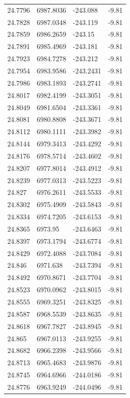\begin{table}[H]
\begin{tabular}{llll}
24.7796 & 6987.8036 & -243.088 & -9.81 \\
24.7828 & 6987.0348 & -243.119 & -9.81 \\
24.7859 & 6986.2659 & -243.15 & -9.81 \\
24.7891 & 6985.4969 & -243.181 & -9.81 \\
24.7923 & 6984.7278 & -243.212 & -9.81 \\
24.7954 & 6983.9586 & -243.2431 & -9.81 \\
24.7986 & 6983.1893 & -243.2741 & -9.81 \\
24.8017 & 6982.4199 & -243.3051 & -9.81 \\
24.8049 & 6981.6504 & -243.3361 & -9.81 \\
24.8081 & 6980.8808 & -243.3671 & -9.81 \\
24.8112 & 6980.1111 & -243.3982 & -9.81 \\
24.8144 & 6979.3413 & -243.4292 & -9.81 \\
24.8176 & 6978.5714 & -243.4602 & -9.81 \\
24.8207 & 6977.8014 & -243.4912 & -9.81 \\
24.8239 & 6977.0313 & -243.5223 & -9.81 \\
24.827 & 6976.2611 & -243.5533 & -9.81 \\
24.8302 & 6975.4909 & -243.5843 & -9.81 \\
24.8334 & 6974.7205 & -243.6153 & -9.81 \\
24.8365 & 6973.95 & -243.6463 & -9.81 \\
24.8397 & 6973.1794 & -243.6774 & -9.81 \\
24.8429 & 6972.4088 & -243.7084 & -9.81 \\
24.846 & 6971.638 & -243.7394 & -9.81 \\
24.8492 & 6970.8671 & -243.7704 & -9.81 \\
24.8523 & 6970.0962 & -243.8015 & -9.81 \\
24.8555 & 6969.3251 & -243.8325 & -9.81 \\
24.8587 & 6968.5539 & -243.8635 & -9.81 \\
24.8618 & 6967.7827 & -243.8945 & -9.81 \\
24.865 & 6967.0113 & -243.9255 & -9.81 \\
24.8682 & 6966.2398 & -243.9566 & -9.81 \\
24.8713 & 6965.4683 & -243.9876 & -9.81 \\
24.8745 & 6964.6966 & -244.0186 & -9.81 \\
24.8776 & 6963.9249 & -244.0496 & -9.81 \\

\end{tabular}
\end{table}

